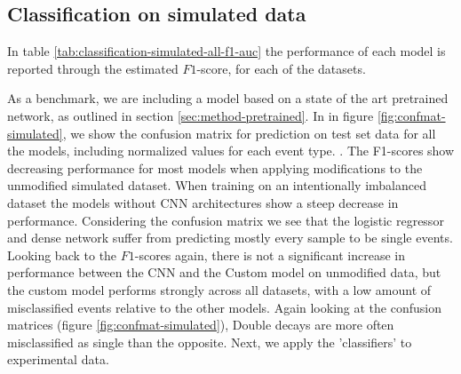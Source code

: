 \subsection{Classification on simulated data}
In table \ref{tab:classification-simulated-all-f1-auc} the performance of each model
is reported through the estimated $F1$-score, for each of the datasets. 

As a benchmark, we are including a model based on a state of the art pretrained 
network\cite{Simonyan2015}, as outlined in section \ref{sec:method-pretrained}. 
In in figure \ref{fig:confmat-simulated}, we show the confusion matrix for prediction
on test set data for all the models, including normalized values for each event type.
. The F1-scores show decreasing
performance for most models when applying modifications to the unmodified simulated dataset.
When training on an intentionally imbalanced dataset the models without CNN architectures 
show a steep decrease in performance.
Considering the confusion matrix we see that the logistic regressor and dense network
suffer from predicting mostly every sample to be single events. Looking back to the
$F1$-scores again, there is not a significant increase in performance between the
CNN and the Custom model on unmodified data, but the custom model performs strongly
across all datasets, with a low amount of misclassified events relative to the other
models. Again looking at the confusion matrices (figure \ref{fig:confmat-simulated}),
Double decays are more often misclassified as single than the opposite.
Next, we apply the 'classifiers' to experimental data.

